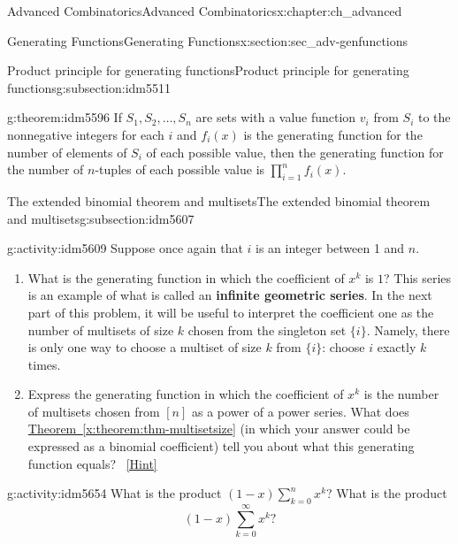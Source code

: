 \documentclass[oneside,10pt,]{book}
\newcommand{\terminology}[1]{\textbf{#1}}
\numberwithin{equation}{chapter}
\begin{document}
\begin{chapterptx}{Advanced Combinatorics}{}{Advanced Combinatorics}{}{}{x:chapter:ch_advanced}
\begin{sectionptx}{Generating Functions}{}{Generating Functions}{}{}{x:section:sec_adv-genfunctions}
\begin{subsectionptx}{Product principle for generating functions}{}{Product principle for generating functions}{}{}{g:subsection:idm5511}
\begin{theorem}{}{}{g:theorem:idm5596}%
If \(S_1,S_2,\dots,S_n\) are sets with a value function \(v_i\) from \(S_i\) to the nonnegative integers for each \(i\) and \(f_i(x)\) is the generating function for the number of elements of \(S_i\) of each possible value, then the generating function for the number of \(n\)-tuples of each possible value is \(\prod_{i=1}^n f_i(x)\).%
\end{theorem}
\end{subsectionptx}
%
%
\typeout{************************************************}
\typeout{************************************************}
%
\begin{subsectionptx}{The extended binomial theorem and multisets}{}{The extended binomial theorem and multisets}{}{}{g:subsection:idm5607}
\begin{activity}{}{g:activity:idm5609}%
Suppose once again that \(i\) is an integer between 1 and \(n\).%
\begin{enumerate}[font=\bfseries,label=(\alph*),ref=\alph*]
\item{}What is the generating function in which the coefficient of \(x^k\) is \(1\)? This series is an example of what is called an \terminology{infinite geometric series}. In the next part of this problem, it will be useful to interpret the coefficient one as the number of multisets of size \(k\) chosen from the singleton set \(\{i\}\). Namely, there is only one way to choose a multiset of size \(k\) from \(\{i\}\): choose \(i\) exactly \(k\) times.%
\item{}Express the generating function in which the coefficient of \(x^k\) is the number of multisets chosen from \([n]\) as a power of a power series.  What does \hyperref[x:theorem:thm-multisetsize]{Theorem~\ref{x:theorem:thm-multisetsize}} (in which your answer could be expressed as a binomial coefficient) tell you about what this generating function equals?%
\qquad~\hfill{\tiny\hyperlink{g:hint:idm5640-back}{[Hint]}}\end{enumerate}
\end{activity}
\begin{activity}{}{g:activity:idm5654}%
What is the product \((1-x)\sum_{k=0}^n x^k\)? What is the product%
\begin{equation*}
(1-x)\sum_{k=0}^\infty x^k?
\end{equation*}
%
\end{activity}

\end{subsectionptx}
\end{sectionptx}
\end{chapterptx}
\end{document}
